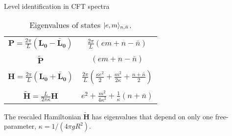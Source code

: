 \newcommand{\uL}{\mathbf{L_0}}
\newcommand{\bL}{\mathbf{\bar{L}_0}}
\begin{frame}{Level identification in CFT spectra}
\vskip-1.5cm
\begin{table}[h]
\centering
\begin{tabular}{c|c}

$\mathbf{P} =\frac{2\pi}{L}(\uL-\bL)$ & 
$\frac{2\pi}{L}(em + n - \bar{n})$ \\
&
\\
$\widetilde{\mathbf{P}}$  &
$(em + n - \bar{n})$\\
& 
\\
$\mathbf{H} = \frac{2\pi}{L}(\uL+\bL)$ &
 $\frac{2\pi}{L}(\frac{\kappa e^2}{2} + \frac{m^2}{2 \kappa} + \frac{n + \bar{n}}{2})$ \\
&
 \\
$\widetilde{\mathbf{H}} = \frac{L}{2 \pi \kappa}\mathbf{H}$ &
 $e^2 + \frac{m^2}{4 \kappa^2} + \frac{1}{\kappa}(n + \bar{n})$       
\end{tabular}
\label{Table:EV}
\caption{Eigenvalues of states $\vert e, m \rangle_{n, \bar{n}}$.} 
\end{table}

The rescaled Hamiltonian $\widetilde{\mathbf{H}}$ has eigenvalues that depend on only one free-parameter, $\kappa = 1/(4 \pi g R^2)$.

\end{frame}
